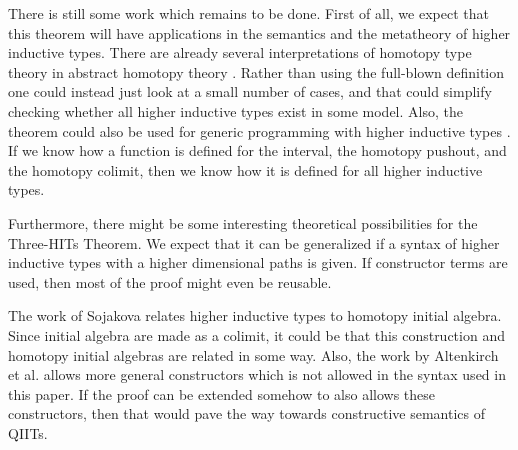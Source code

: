 \documentclass[a4paper,UKenglish]{lipics-v2016}
\begin{document}
There is still some work which remains to be done.
First of all, we expect that this theorem will have applications in the semantics and the metatheory of higher inductive types.
There are already several interpretations of homotopy type theory in abstract homotopy theory \cite{arndt2011homotopy,awodey2009homotopy,bezem2014model,cohen2016cubical,kapulkin2012simplicial}.
Rather than using the full-blown definition one could instead just look at a small number of cases, and that could simplify checking whether all higher inductive types exist in some model.
Also, the theorem could also be used for generic programming with higher inductive types \cite{altenkirch2003generic}.
If we know how a function is defined for the interval, the homotopy pushout, and the homotopy colimit, then we know how it is defined for all higher inductive types.

Furthermore, there might be some interesting theoretical possibilities for the Three-HITs Theorem.
We expect that it can be generalized if a syntax of higher inductive types with a higher dimensional paths is given.
If constructor terms are used, then most of the proof might even be reusable.

The work of Sojakova \cite{sojakova2015higher} relates higher inductive types to homotopy initial algebra.
Since initial algebra are made as a colimit, it could be that this construction and homotopy initial algebras are related in some way.
Also, the work by Altenkirch et al. \cite{altenkirch2016quotient} allows more general constructors which is not allowed in the syntax used in this paper.
If the proof can be extended somehow to also allows these constructors, then that would pave the way towards constructive semantics of QIITs.






\end{document}
